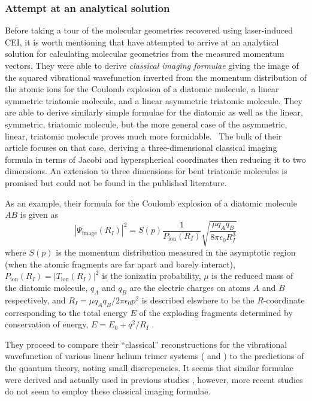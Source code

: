\subsubsection*{Attempt at an analytical solution}
Before taking a tour of the molecular geometries recovered using laser-induced CEI, it is worth mentioning that \citet{Nagaya04} have attempted to arrive at an analytical solution for calculating molecular geometries from the measured momentum vectors. They were able to derive \emph{classical imaging formulae} giving the image of the squared vibrational wavefunction inverted from the momentum distribution of the atomic ions for the Coulomb explosion of a diatomic molecule, a linear symmetric triatomic molecule, and a linear asymmetric triatomic molecule. They are able to derive similarly simple formulae for the diatomic as well as the linear, symmetric, triatomic molecule, but the more general case of the asymmetric, linear, triatomic molecule proves much more formidable.\footnotemark~ The bulk of their article focuses on that case, deriving a three-dimensional classical imaging formula in terms of Jacobi and hyperspherical coordinates then reducing it to two dimensions. An extension to three dimensions for bent triatomic molecules is promised but could not be found in the published literature.

As an example, their formula for the Coulomb explosion of a diatomic molecule $AB$ is given as
\begin{equation}
|\Psi_\mathrm{image}(R_I)|^2 = S(p) \frac{1}{P_\mathrm{ion}(R_I)} \sqrt{\frac{\mu q_A q_B}{8\pi\epsilon_0 R_I^3}}
\end{equation}
where $S(p)$ is the momentum distribution measured in the asymptotic region (when the atomic fragments are far apart and barely interact), $P_\mathrm{ion}(R_I) = |T_\mathrm{ion}(R_I)|^2$ is the ionizatin probability, $\mu$ is the reduced mass of the diatomic molecule, $q_A$ and $q_B$ are the electric charges on atoms $A$ and $B$ respectively, and $R_I = \mu q_A q_B/2\pi\epsilon_0 p^2$ is described elswhere to be the $R$-coordinate  corresponding to the total energy $E$ of the exploding fragments determined by conservation of energy, $E = E_0 + q^2/R_I$ \citep{Chelkowski02}.

They proceed to compare their ``classical'' reconstructions for the vibrational wavefunction of various linear helium trimer systems ( and ) to the predictions of the quantum theory, noting small discrepencies. It seems that similar formulae were derived and actually used in previous studies \citep{Bandrauk01, Chelkowski02}, however, more recent studies do not seem to employ these classical imaging formulae.


